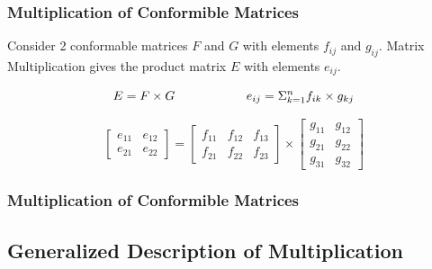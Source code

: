 \documentclass[fleqn]{beamer} %
\newcommand{\sectionIIsubsectionIItitle}{Multiplication of Conformible Matrices}
\newcommand{\sectionIIsubsectionIIItitle}{Generalized Description of Multiplication}
\begin{document}
			\begin{frame}
				\frametitle{\sectionIIsubsectionIItitle} \small
				\bigskip

				Consider 2 conformable matrices $F$ and $G$ with elements $f_{ij}$ and $g_{ij}$. Matrix Multiplication gives the product matrix $E$ with elements $e_{ij}$.\vspace{0mm} 
		 
		 		\[E = F \times G \hspace{20mm} e_{ij}=\Sigma_{k=1}^n f_{ik}\times g_{kj}\] 
			 
				\[
				\left[ \begin{array}{cc}
				e_{11} & e_{12}  \\
				e_{21} & e_{22}  \end{array} \right]=	 	
		 		\left[ \begin{array}{ccc}
				f_{11} & f_{12} & f_{13} \\
				f_{21} & f_{22} & f_{23} \end{array} \right] \times \left[ \begin{array}{cc}
				g_{11}&g_{12} \\
				g_{21}&g_{22} \\
				g_{31}&g_{32} \end{array} \right] 
				\]

				\btVFill 
			\end{frame}	

			\begin{frame}
				\frametitle{\sectionIIsubsectionIItitle} \small
				\bigskip

				\btVFill
			\end{frame}		


		\subsection{\sectionIIsubsectionIIItitle}\label{sectionIIsubsectionIII}
\end{document}
